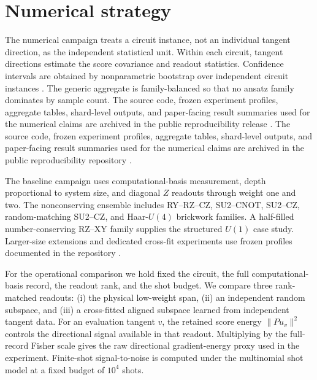 \documentclass[aps,prx,reprint,superscriptaddress,nofootinbib,longbibliography]{revtex4-2}
\begin{document}
\section{Numerical strategy}

The numerical campaign treats a circuit instance, not an individual tangent direction, as the independent statistical unit. Within each circuit, tangent directions estimate the score covariance and readout statistics. Confidence intervals are obtained by nonparametric bootstrap over independent circuit instances \cite{Efron1979}. The generic aggregate is family-balanced so that no ansatz family dominates by sample count. The source code, frozen experiment profiles, aggregate tables, shard-level outputs, and paper-facing result summaries used for the numerical claims are archived in the public reproducibility release \cite{AitHaddou2026MeasurementAccessible}. The source code, frozen experiment profiles, aggregate tables, shard-level outputs, and paper-facing result summaries used for the numerical claims are archived in the public reproducibility repository \cite{AitHaddou2026MeasurementAccessible}.

The baseline campaign uses computational-basis measurement, depth proportional to system size, and diagonal $Z$ readouts through weight one and two. The nonconserving ensemble includes RY--RZ--CZ, SU2--CNOT, SU2--CZ, random-matching SU2--CZ, and Haar-$U(4)$ brickwork families. A half-filled number-conserving RZ--XY family supplies the structured $U(1)$ case study. Larger-size extensions and dedicated cross-fit experiments use frozen profiles documented in the repository \cite{AitHaddou2026MeasurementAccessible}.

For the operational comparison we hold fixed the circuit, the full computational-basis record, the readout rank, and the shot budget. We compare three rank-matched readouts: (i) the physical low-weight span, (ii) an independent random subspace, and (iii) a cross-fitted aligned subspace learned from independent tangent data. For an evaluation tangent $v$, the retained score energy $\|P u_v\|^2$ controls the directional signal available in that readout. Multiplying by the full-record Fisher scale gives the raw directional gradient-energy proxy used in the experiment. Finite-shot signal-to-noise is computed under the multinomial shot model at a fixed budget of $10^4$ shots.
\end{document}
